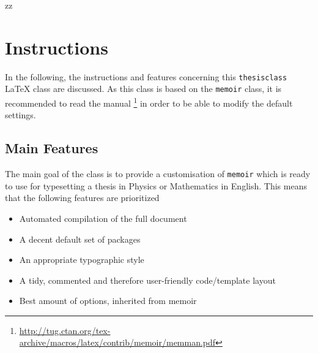 zz%
%
%
% 
%

\chapter[Instructions][Instructions]{Instructions}
\label{Instructions}

In the following, the instructions and features concerning this \texttt{thesisclass} \LaTeX\hspace{2pt} class are discussed. As this class is based on the \texttt{memoir} class, it is recommended to read the manual \cite{memoirman} \footnote{\url{http://tug.ctan.org/tex-archive/macros/latex/contrib/memoir/memman.pdf}} in order to be able to modify the default settings.

\section{Main Features}

The main goal of the class is to provide a customisation of \texttt{memoir} which is ready to use for typesetting a thesis in Physics or Mathematics in English. This means that the following features are prioritized

\begin{itemize}
\item Automated compilation of the full document
\item A decent default set of packages
\item An appropriate typographic style
\item A tidy, commented and therefore user-friendly code/template layout 
\item Best amount of options, inherited from memoir
\end{itemize}

